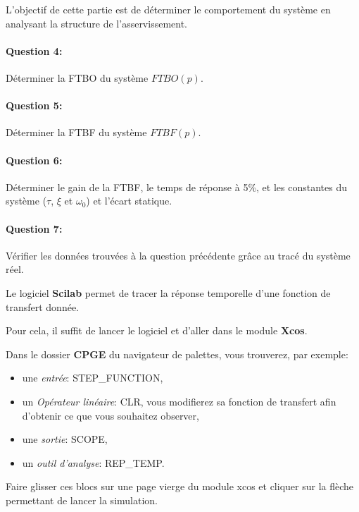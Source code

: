 L'objectif de cette partie est de déterminer le comportement du système en analysant la structure de l'asservissement.
~\

\paragraph{Question 4:} Déterminer la FTBO du système $FTBO(p)$.

\paragraph{Question 5:} Déterminer la FTBF du système $FTBF(p)$.

\paragraph{Question 6:} Déterminer le gain de la FTBF, le temps de réponse à 5\%, et les constantes du système ($\tau$, $\xi$ et $\omega_0$) et l'écart statique.

\paragraph{Question 7:} Vérifier les données trouvées à la question précédente grâce au tracé du système réel.
 
\ifdef{\public}{\cleardoublepage}{}


Le logiciel \textbf{Scilab} permet de tracer la réponse temporelle d'une fonction de transfert donnée.

Pour cela, il suffit de lancer le logiciel et d'aller dans le module \textbf{Xcos}.

Dans le dossier \textbf{CPGE} du navigateur de palettes, vous trouverez, par exemple:
\begin{itemize}
 \item une \textit{entrée}: STEP\_FUNCTION,
 \item un \textit{Opérateur linéaire}: CLR, vous modifierez sa fonction de transfert afin d'obtenir ce que vous souhaitez observer,
 \item une \textit{sortie}: SCOPE,
 \item un \textit{outil d'analyse}: REP\_TEMP.
\end{itemize}

Faire glisser ces blocs sur une page vierge du module xcos et cliquer sur la flèche permettant de lancer la simulation.

